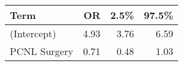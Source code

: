 \begin{table}[ht]
\centering
\begin{tabular}{lrrr}
  \toprule
{\textbf{Term}} & {\textbf{OR}} & {\textbf{2.5\%}} & {\textbf{97.5\%}} \\ 
  \midrule
(Intercept) & 4.93 & 3.76 & 6.59 \\ 
  PCNL Surgery & 0.71 & 0.48 & 1.03 \\ 
   \bottomrule
\end{tabular}
\end{table}

